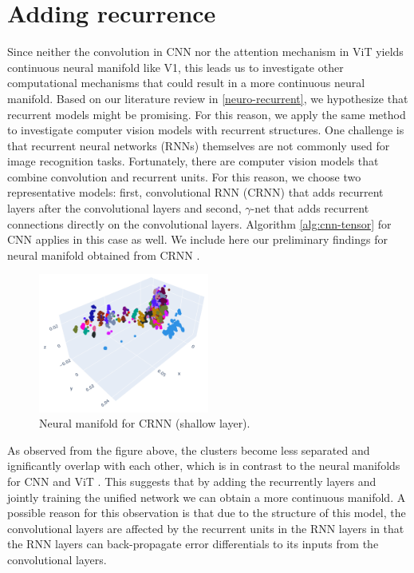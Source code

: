 \section{Adding recurrence}
Since neither the convolution in CNN nor the attention mechanism in ViT yields continuous neural manifold like V1, this leads us to investigate other computational mechanisms that could result in a more continuous neural manifold. Based on our literature review in \ref{neuro-recurrent}, we hypothesize that recurrent models might be promising. For this reason, we apply the same method to investigate computer vision models with recurrent structures. One challenge is that recurrent neural networks (RNNs) themselves are not commonly used for image recognition tasks. Fortunately, there are computer vision models that combine convolution and recurrent units. For this reason, we choose two representative models: first, convolutional RNN (CRNN) \cite{convrnn_shi_end--end_2015} that adds recurrent layers after the convolutional layers and second, $\gamma$-net \cite{serre-recurrence} that adds recurrent connections directly on the convolutional layers. Algorithm \ref{alg:cnn-tensor} for CNN applies in this case as well. We include here our preliminary findings for neural manifold obtained from CRNN \cite{convrnn_shi_end--end_2015}.  
\begin{figure}[H]
\centering
    \includegraphics[width=0.5\textwidth]{figures/embeddings/crnn-2d-layer1.png}
\caption{Neural manifold for CRNN (shallow layer).}
\end{figure}
As observed from the figure above, the clusters become less separated and  ignificantly overlap with each other, which is in contrast to the neural manifolds for CNN and ViT . This suggests that by adding the recurrently layers and jointly training the unified network we can obtain a more continuous manifold. A possible reason for this observation is that due to the structure of this model, the convolutional layers are affected by the recurrent units in the RNN layers in that the RNN layers can back-propagate error differentials to its inputs from the convolutional layers. 


